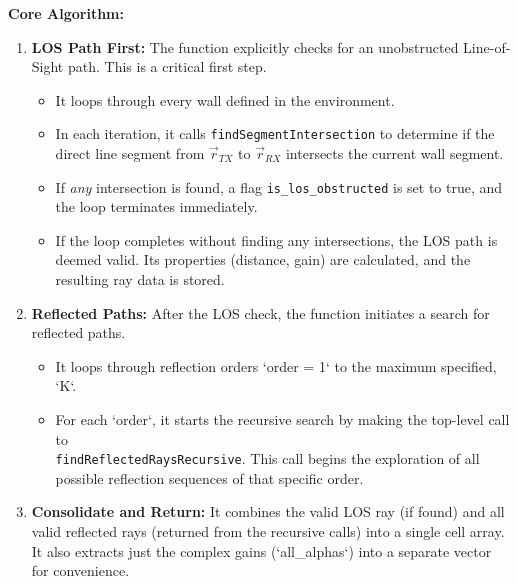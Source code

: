 \documentclass{article}
\begin{document}
	\textbf{Core Algorithm:}
	\begin{enumerate}
		\item \textbf{LOS Path First:} The function explicitly checks for an unobstructed Line-of-Sight path. This is a critical first step.
		\begin{itemize}
			\item It loops through every wall defined in the environment.
			\item In each iteration, it calls \texttt{findSegmentIntersection} to determine if the direct line segment from $\vec{r}_{TX}$ to $\vec{r}_{RX}$ intersects the current wall segment.
			\item If \textit{any} intersection is found, a flag \texttt{is\_los\_obstructed} is set to true, and the loop terminates immediately.
			\item If the loop completes without finding any intersections, the LOS path is deemed valid. Its properties (distance, gain) are calculated, and the resulting ray data is stored.
		\end{itemize}
		\item \textbf{Reflected Paths:} After the LOS check, the function initiates a search for reflected paths.
		\begin{itemize}
			\item It loops through reflection orders `order = 1` to the maximum specified, `K`.
			\item For each `order`, it starts the recursive search by making the top-level call to\\
			 \texttt{findReflectedRaysRecursive}. This call begins the exploration of all possible reflection sequences of that specific order.
		\end{itemize}
		\item \textbf{Consolidate and Return:} It combines the valid LOS ray (if found) and all valid reflected rays (returned from the recursive calls) into a single cell array. It also extracts just the complex gains (`all\_alphas`) into a separate vector for convenience.
	\end{enumerate}
	
	
	
\end{document}
